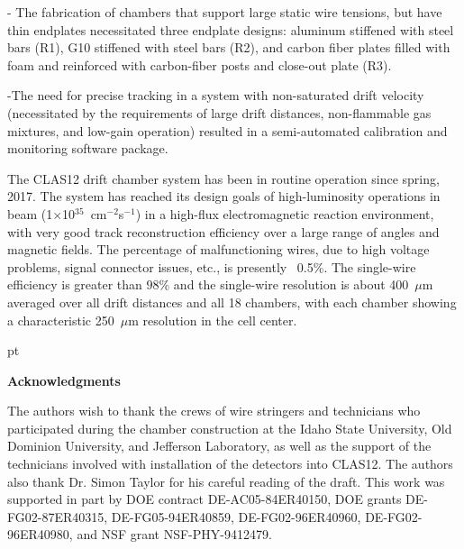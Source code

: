 \noindent
- The fabrication of chambers that support large static wire tensions, but have thin 
endplates necessitated three endplate designs: aluminum stiffened with steel bars (R1),
G10 stiffened with steel bars (R2), and carbon fiber plates filled with foam and reinforced
with carbon-fiber posts and close-out plate (R3). 

\noindent
-The need for precise tracking in a system with non-saturated drift velocity 
(necessitated by the requirements of large drift distances, non-flammable gas mixtures, 
and low-gain operation) resulted in a semi-automated calibration and monitoring software 
package.

\vskip 10pt
The CLAS12 drift chamber system has been in routine operation since spring, 2017. 
The system has reached its design goals of high-luminosity operations in beam
(1$\times$10$^{35}$~cm$^{-2}$s$^{-1}$) in a high-flux electromagnetic reaction
environment, with very good track reconstruction efficiency over a large range of angles and 
magnetic fields.  
The percentage of malfunctioning wires, due to high voltage problems, signal
connector issues, etc., is presently ~0.5\%.
The single-wire efficiency is greater than $98\%$ and the
single-wire resolution is about 400~$\mu$m averaged over all drift distances and
all 18 chambers, with each chamber showing a characteristic 250~$\mu$m resolution 
in the cell center.

 pt

{\large{\bf Acknowledgments}}

\vskip 10pt

The authors wish to thank the crews of wire stringers and technicians who 
participated during the chamber construction at the Idaho State University,
Old Dominion University, and Jefferson Laboratory, as well as the support of 
the technicians involved with installation of the detectors into CLAS12.  The
authors also thank Dr. Simon Taylor for his careful reading of the draft.  This
work was supported in part by DOE contract DE-AC05-84ER40150, DOE grants 
DE-FG02-87ER40315, DE-FG05-94ER40859, DE-FG02-96ER40960, DE-FG02-96ER40980, 
and NSF grant NSF-PHY-9412479.





